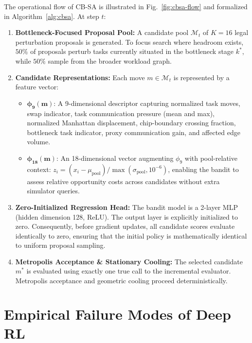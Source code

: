 \documentclass[10pt,conference]{IEEEtran}
\begin{document}
The operational flow of CB-SA is illustrated in Fig.~\ref{fig:cbsa-flow} and formalized in Algorithm~\ref{alg:cbsa}.
At step $t$:
\begin{enumerate}
  \item \textbf{Bottleneck-Focused Proposal Pool:} A candidate pool $\mathcal{M}_t$ of $K=16$ legal perturbation proposals is generated. To focus search where headroom exists, $50\%$ of proposals perturb tasks currently situated in the bottleneck stage $k^*$, while $50\%$ sample from the broader workload graph.
  \item \textbf{Candidate Representations:} Each move $m \in \mathcal{M}_t$ is represented by a feature vector:
    \begin{itemize}
      \item $\bm{\phi_9(m)}$: A 9-dimensional descriptor capturing normalized task moves, swap indicator, task communication pressure (mean and max), normalized Manhattan displacement, chip-boundary crossing fraction, bottleneck task indicator, proxy communication gain, and affected edge volume.
      \item $\bm{\phi_{18}(m)}$: An 18-dimensional vector augmenting $\phi_9$ with pool-relative context: $z_i = (x_i - \mu_{\text{pool}}) / \max(\sigma_{\text{pool}}, 10^{-6})$, enabling the bandit to assess relative opportunity costs across candidates without extra simulator queries.
    \end{itemize}
  \item \textbf{Zero-Initialized Regression Head:} The bandit model is a 2-layer MLP (hidden dimension 128, ReLU). The output layer is explicitly initialized to zero. Consequently, before gradient updates, all candidate scores evaluate identically to zero, ensuring that the initial policy is mathematically identical to uniform proposal sampling.
  \item \textbf{Metropolis Acceptance \& Stationary Cooling:} The selected candidate $m^*$ is evaluated using exactly one true call to the incremental evaluator. Metropolis acceptance and geometric cooling proceed deterministically.
\end{enumerate}

\section{Empirical Failure Modes of Deep RL}
\label{sec:failure-modes}
\end{document}
